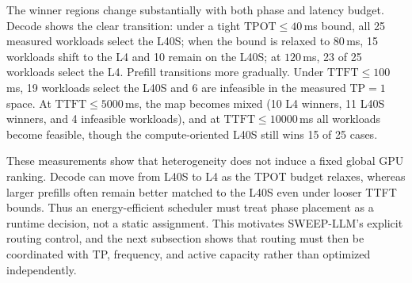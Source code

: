 The winner regions change substantially with both phase and latency budget. 
Decode shows the clear transition: under a tight $\mathrm{TPOT}\leq 40$\,ms bound, all 25 measured workloads select the L40S; when the bound is relaxed to $80$\,ms, 15 workloads shift to the L4 and 10 remain on the L40S; at $120$\,ms, 23 of 25 workloads select the L4. 
Prefill transitions more gradually. 
Under $\mathrm{TTFT}\leq 100$\,ms, 19 workloads select the L40S and 6 are infeasible in the measured $\mathrm{TP}{=}1$ space. 
At $\mathrm{TTFT}\leq 5000$\,ms, the map becomes mixed (10 L4 winners, 11 L40S winners, and 4 infeasible workloads), and at $\mathrm{TTFT}\leq 10000$\,ms all workloads become feasible, though the compute-oriented L40S still wins 15 of 25 cases.

These measurements show that heterogeneity does not induce a fixed global GPU ranking. 
Decode can move from L40S to L4 as the TPOT budget relaxes, whereas larger prefills often remain better matched to the L40S even under looser TTFT bounds. 
Thus an energy-efficient scheduler must treat phase placement as a runtime decision, not a static assignment. 
This motivates SWEEP-LLM's explicit routing control, and the next subsection shows that routing must then be coordinated with TP, frequency, and active capacity rather than optimized independently.



